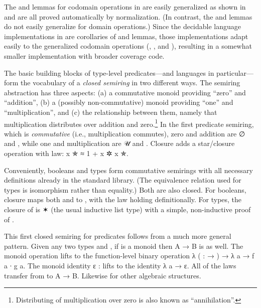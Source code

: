 \documentclass[acmsmall,screen]{acmart}
\begin{document}
\rnc{}
The  and  lemmas for codomain operations in  are easily generalized as shown in  and are all proved automatically by normalization.
(In contrast, the  and  lemmas do not easily generalize for domain operations.)
Since the decidable language implementations in  are corollaries of  and  lemmas, those implementations adapt easily to the generalized codomain operations (, , and ), resulting in a somewhat smaller implementation with broader coverage code.



The basic building blocks of type-level predicates---and languages in particular---form the vocabulary of a \emph{closed semiring} in two different ways.
The semiring abstraction has three aspects: (a) a commutative monoid providing ``zero'' and ``addition'', (b) a (possibly non-commutative) monoid providing ``one'' and ``multiplication'', and (c) the relationship between them, namely that multiplication distributes over addition and zero.\footnote{Distributing of multiplication over zero is also known as ``annihilation''.}
In the first predicate semiring, which is \emph{commutative} (i.e., multiplication commutes), zero and addition are \AF ∅ and , while one and multiplication are \AF 𝒰 and .
Closure adds a star/closure operation  with  law: {\AB x \AF ✯ \AF ≈ 1 \AF + \AB x \AF ✲ \AB x \AF ✯}.

Conveniently, booleans and types form commutative semirings with all necessary definitions already in the standard library.
(The equivalence relation used for types is isomorphism rather than equality.)
Both are also closed.
For booleans, closure maps both  and  to , with the  law holding definitionally.
For types, the closure of  is { ✶} (the usual inductive list type) with a simple, non-inductive proof of .

This first closed semiring for predicates follows from a much more general pattern.
Given any two types  and , if  is a monoid then {\AB A \AS → \AB B} is as well.
The monoid operation  lifts to the function-level binary operation {\AS λ (  :  \AS → ) \AS → \AS λ \AB a \AS → \AB f \AB a \AB ∙ \AB g \AB a}.
The monoid identity {\AB ε \AS : } lifts to the identity {\AS λ \AB a \AS → \AB ε}.
All of the laws transfer from  to {\AB A \AS → \AB B}.
Likewise for other algebraic structures.
\end{document}
